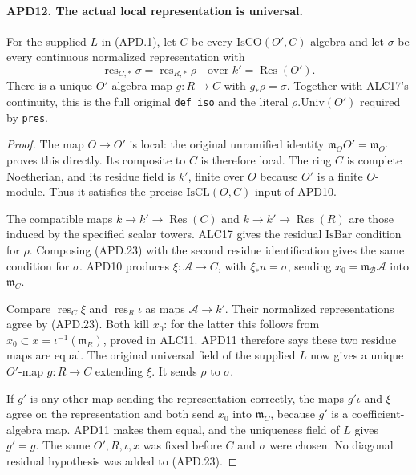 \paragraph{APD12. The actual local representation is universal.}
\label{claim:APD12}
For the supplied \(L\) in (APD.1), let \(C\) be every
\(\mathrm{IsCO}(O',C)\)-algebra and let \(\sigma\) be every
continuous normalized representation with
\[
 \operatorname{res}_{C,*}\sigma
                     =\operatorname{res}_{R,*}\rho
                    \quad\text{over }k'=\operatorname{Res}(O').
                                                               \tag{APD.23}
\]
There is a unique \(O'\)-algebra map \(g:R\to C\) with
\(g_*\rho=\sigma\).  Together with ALC17's continuity,
this is the full original \texttt{def\_iso} and the literal
\(\rho.\mathrm{Univ}(O')\) required by \texttt{pres}.

\begin{proof}
The map \(O\to O'\) is local: the original unramified
identity \(\mathfrak m_OO'=\mathfrak m_{O'}\) proves this
directly.  Its composite to \(C\) is therefore local.
The ring \(C\) is complete Noetherian, and its residue field
is \(k'\), finite over \(O\) because \(O'\) is a finite
\(O\)-module.  Thus it satisfies the precise
\(\mathrm{IsCL}(O,C)\) input of APD10.

The compatible maps \(k\to k'\to\operatorname{Res}(C)\)
and \(k\to k'\to\operatorname{Res}(R)\) are those induced
by the specified scalar towers.  ALC17 gives the residual
\(\mathrm{IsBar}\) condition for \(\rho\).  Composing
(APD.23) with the second residue identification gives the same
condition for \(\sigma\).  APD10 produces
\(\xi:\mathcal A\to C\), with \(\xi_*u=\sigma\), sending
\(x_0=\mathfrak m_{\mathcal B}\mathcal A\) into
\(\mathfrak m_C\).

Compare \(\operatorname{res}_C\xi\) and
\(\operatorname{res}_R\iota\) as maps \(\mathcal A\to k'\).
Their normalized representations agree by (APD.23).  Both kill
\(x_0\): for the latter this follows from
\(x_0\subset x=\iota^{-1}(\mathfrak m_R)\), proved in
ALC11.  APD11 therefore says these two residue maps are equal.
The original universal field of the supplied \(L\) now gives
a unique \(O'\)-map \(g:R\to C\) extending \(\xi\).
It sends \(\rho\) to \(\sigma\).

If \(g'\) is any other map sending the representation correctly,
the maps \(g'\iota\) and \(\xi\) agree on the representation
and both send \(x_0\) into \(\mathfrak m_C\), because
\(g'\) is a coefficient-algebra map.  APD11 makes them equal,
and the uniqueness field of \(L\) gives \(g'=g\).
The same \(O',R,\iota,x\) was fixed before \(C\) and
\(\sigma\) were chosen.  No diagonal residual hypothesis was
added to (APD.23).
\end{proof}

